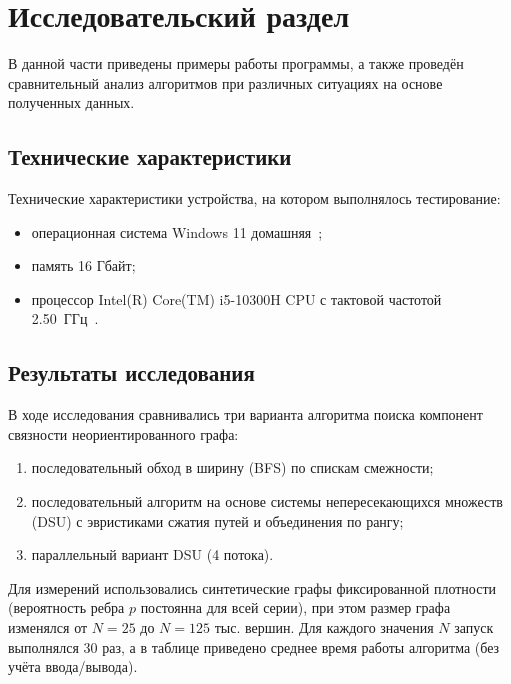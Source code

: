 \chapter{Исследовательский раздел}

В данной части приведены примеры работы программы, а также проведён сравнительный анализ алгоритмов при различных ситуациях на основе полученных данных.

\section{Технические характеристики}

Технические характеристики устройства, на котором выполнялось тестирование:

\begin{itemize}
	\item операционная система Windows 11 домашняя~\cite{windows11};
	\item память 16 Гбайт;
	\item процессор Intel(R) Core(TM) i5-10300H CPU с тактовой частотой 2.50~ГГц~\cite{intel_i5}.
\end{itemize}

\section{Результаты исследования}

В ходе исследования сравнивались три варианта алгоритма поиска компонент связности неориентированного графа:
\begin{enumerate}
	\item последовательный обход в ширину (BFS) по спискам смежности;
	\item последовательный алгоритм на основе системы непересекающихся множеств (DSU) с эвристиками сжатия путей и объединения по рангу;
	\item параллельный вариант DSU (4 потока).
\end{enumerate}

Для измерений использовались синтетические графы фиксированной плотности (вероятность ребра $p$ постоянна для всей серии), при этом размер графа изменялся от $N=25$ до $N=125$ тыс. вершин. Для каждого значения $N$ запуск выполнялся 30 раз, а в таблице приведено среднее время работы алгоритма (без учёта ввода/вывода).

